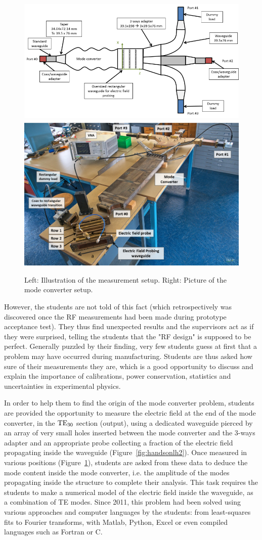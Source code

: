 \begin{figure}
	\centering
	\includegraphics[width=0.55\linewidth]{figures/chap5/handson_LH_3}
	\includegraphics[width=0.44\linewidth]{figures/chap5/handson_LH_4}
	\caption{Left: Illustration of the measurement setup. Right: Picture of the mode converter setup.}
	\label{fig:handsonlh3}
\end{figure}


However, the students are not told of this fact (which retrospectively was discovered once the RF measurements had been made during prototype acceptance test). They thus find unexpected results and the supervisors act as if they were surprised, telling the students that the "RF design" is supposed to be perfect. Generally puzzled by their finding, very few students guess at first that a problem may have occurred during manufacturing. Students are thus asked how sure of their measurements they are, which is a good opportunity to discuss and explain the importance of calibrations, power conservation, statistics and uncertainties in experimental physics.

In order to help them to find the origin of the mode converter problem, students are provided the opportunity to measure the electric field at the end of the mode converter, in the ${\mathrm{TE}}_{30}$ section (output), using a dedicated waveguide pierced by an array of very small holes inserted between the mode converter and the 3-ways adapter and an appropriate probe collecting a fraction of the electric field propagating inside the waveguide (Figure~\ref{fig:handsonlh2}). Once measured in various positions (Figure~\ref{fig:handsonlh3}), students are asked from these data to deduce the mode content inside the mode converter, i.e. the amplitude of the modes propagating inside the structure to complete their analysis. This task requires the students to make a numerical model of the electric field inside the waveguide, as a combination of TE modes. Since 2011, this problem had been solved using various approaches and computer languages by the students: from least-squares fits to Fourier transforms, with Matlab, Python, Excel or even compiled languages such as Fortran or C. 


